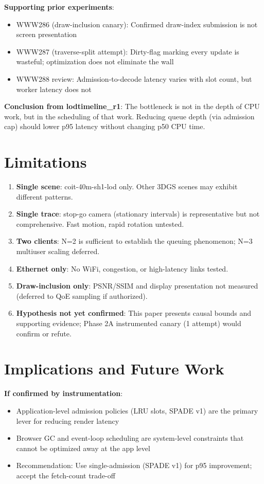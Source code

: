 \documentclass[sigconf,anonymous,review]{acmart}
\begin{document}
\textbf{Supporting prior experiments}:
\begin{itemize}
  \item WWW286 (draw-inclusion canary): Confirmed draw-index submission is not screen presentation
  \item WWW287 (traverse-split attempt): Dirty-flag marking every update is wasteful; optimization does not eliminate the wall
  \item WWW288 review: Admission-to-decode latency varies with slot count, but worker latency does not
\end{itemize}

\textbf{Conclusion from lodtimeline\_r1}:
The bottleneck is not in the depth of CPU work, but in the scheduling of that work. Reducing queue depth (via admission cap) should lower p95 latency without changing p50 CPU time.

\section{Limitations}

\begin{enumerate}
  \item \textbf{Single scene}: coit-40m-sh1-lod only. Other 3DGS scenes may exhibit different patterns.
  \item \textbf{Single trace}: stop-go camera (stationary intervals) is representative but not comprehensive. Fast motion, rapid rotation untested.
  \item \textbf{Two clients}: N=2 is sufficient to establish the queuing phenomenon; N=3 multiuser scaling deferred.
  \item \textbf{Ethernet only}: No WiFi, congestion, or high-latency links tested.
  \item \textbf{Draw-inclusion only}: PSNR/SSIM and display presentation not measured (deferred to QoE sampling if authorized).
  \item \textbf{Hypothesis not yet confirmed}: This paper presents causal bounds and supporting evidence; Phase 2A instrumented canary (1 attempt) would confirm or refute.
\end{enumerate}

\section{Implications and Future Work}

\textbf{If confirmed by instrumentation}:
\begin{itemize}
  \item Application-level admission policies (LRU slots, SPADE v1) are the primary lever for reducing render latency
  \item Browser GC and event-loop scheduling are system-level constraints that cannot be optimized away at the app level
  \item Recommendation: Use single-admission (SPADE v1) for p95 improvement; accept the fetch-count trade-off
\end{itemize}
\end{document}
